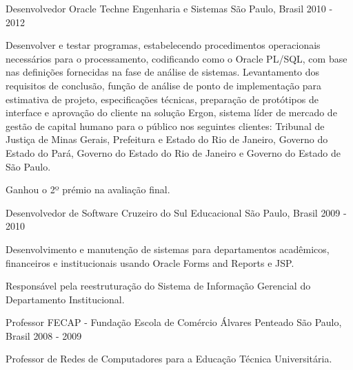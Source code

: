 \begin{cventries}
  \cventry
    {Desenvolvedor Oracle} %
    {Techne Engenharia e Sistemas} %
	{São Paulo, Brasil} %
    {2010 - 2012} %
    {
      \begin{cvitems} %
        \item {Desenvolver e testar programas, estabelecendo procedimentos operacionais necessários para o processamento, codificando como o Oracle PL/SQL, com base nas definições fornecidas na fase de análise de sistemas.
Levantamento dos requisitos de conclusão, função de análise de ponto de implementação para estimativa de projeto, especificações técnicas, preparação de protótipos de interface e aprovação do cliente na solução Ergon, sistema líder de mercado de gestão de capital humano para o público nos seguintes clientes: Tribunal de Justiça de Minas Gerais, Prefeitura e Estado do Rio de Janeiro, Governo do Estado do Pará, Governo do Estado do Rio de Janeiro e Governo do Estado de São Paulo.}
        \item {Ganhou o 2º prémio na avaliação final.}
      \end{cvitems}
    }

  \cventry
    {Desenvolvedor de Software} %
    {Cruzeiro do Sul Educacional} %
    {São Paulo, Brasil} %
    {2009 - 2010} %
    {
      \begin{cvitems} %
        \item {Desenvolvimento e manutenção de sistemas para departamentos acadêmicos, financeiros e institucionais usando Oracle Forms and Reports e JSP.}
        \item {Responsável pela reestruturação do Sistema de Informação Gerencial do Departamento Institucional.}
      \end{cvitems}
    }

  \cventry
    {Professor} %
    {FECAP - Fundação Escola de Comércio Álvares Penteado} %
    {São Paulo, Brasil} %
    {2008 - 2009} %
    {
      \begin{cvitems} %
        \item {Professor de Redes de Computadores para a Educação Técnica Universitária.}
      \end{cvitems}
    }


\end{cventries}
